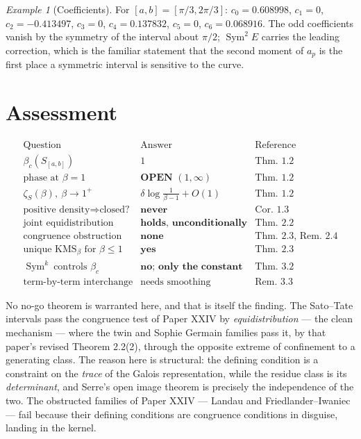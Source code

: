 \documentclass[11pt]{amsart}
\numberwithin{equation}{section}
\theoremstyle{definition}
\theoremstyle{remark}
\newtheorem{example}[theorem]{Example}
\newcommand{\Sym}{\operatorname{Sym}}
\begin{document}
\begin{example}[Coefficients]\label{ex:coeffs}
For $[a,b]=[\pi/3,2\pi/3]$: $c_0=0.608998$, $c_1=0$, $c_2=-0.413497$, $c_3=0$,
$c_4=0.137832$, $c_5=0$, $c_6=0.068916$. The odd coefficients vanish by the symmetry of the
interval about $\pi/2$; $\Sym^2E$ carries the leading correction, which is the familiar
statement that the second moment of $a_p$ is the first place a symmetric interval is
sensitive to the curve.
\end{example}

\section{Assessment}

\[
\begin{array}{lll}
\text{Question} & \text{Answer} & \text{Reference}\\\hline
\beta_c(S_{[a,b]}) & 1 & \text{Thm.~1.2}\\
\text{phase at }\beta=1 & \textbf{OPEN }(1,\infty) & \text{Thm.~1.2}\\
\zeta_S(\beta),\ \beta\to1^+ & \delta\log\frac{1}{\beta-1}+O(1) & \text{Thm.~1.2}\\
\text{positive density}\Rightarrow\text{closed?} & \textbf{never} & \text{Cor.~1.3}\\
\text{joint equidistribution} & \textbf{holds, unconditionally} & \text{Thm.~2.2}\\
\text{congruence obstruction} & \textbf{none} & \text{Thm.~2.3, Rem.~2.4}\\
\text{unique }\mathrm{KMS}_\beta\text{ for }\beta\le1 & \textbf{yes} & \text{Thm.~2.3}\\
\Sym^k\ \text{controls }\beta_c & \textbf{no; only the constant} & \text{Thm.~3.2}\\
\text{term-by-term interchange} & \text{needs smoothing} & \text{Rem.~3.3}
\end{array}
\]

No no-go theorem is warranted here, and that is itself the finding. The Sato--Tate
intervals pass the congruence test of Paper XXIV by \emph{equidistribution} --- the clean
mechanism --- where the twin and Sophie Germain families pass it, by that paper's revised
Theorem 2.2(2), through the opposite extreme of confinement to a generating class. The
reason here is structural: the defining condition is a
constraint on the \emph{trace} of the Galois representation, while the residue class is its
\emph{determinant}, and Serre's open image theorem \cite{Serre} is precisely the independence of the two.
The obstructed families of Paper XXIV --- Landau and Friedlander--Iwaniec --- fail because
their defining conditions are congruence conditions in disguise, landing in the kernel.
\end{document}

